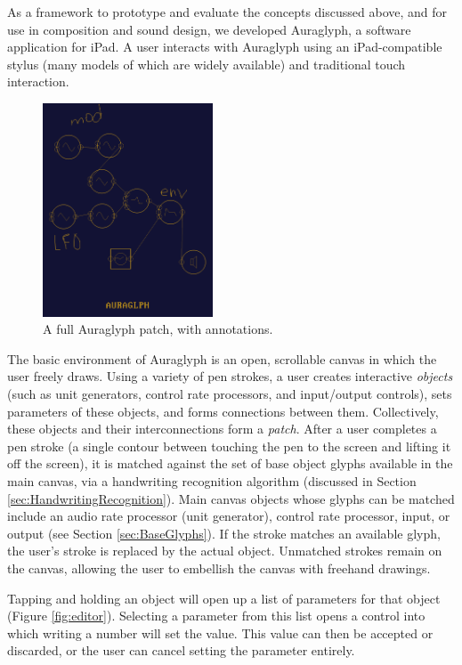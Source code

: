 \documentclass{nime-alternate}
\begin{document}
As a framework to prototype and evaluate the concepts discussed above, and for use in composition and sound design, we developed Auraglyph, a software application for iPad. 
A user interacts with Auraglyph using an iPad-compatible stylus (many models of which are widely available) and traditional touch interaction. 

\begin{figure}[h]
	\centering
		\includegraphics[width=0.45\textwidth]{figures/patch.png}
	\caption{A full Auraglyph patch, with annotations.}
	\label{fig:patch}
\end{figure}

The basic environment of Auraglyph is an open, scrollable canvas in which the user freely draws. 
Using a variety of pen strokes, a user creates interactive \emph{objects} (such as unit generators, control rate processors, and input/output controls), sets parameters of these objects, and forms connections between them. 
Collectively, these objects and their interconnections form a \emph{patch}. 
After a user completes a pen stroke (a single contour between touching the pen to the screen and lifting it off the screen), it is matched against the set of base object glyphs available in the main canvas, via a handwriting recognition algorithm (discussed in Section \ref{sec:HandwritingRecognition}). 
Main canvas objects whose glyphs can be matched include an audio rate processor (unit generator), control rate processor, input, or output (see Section \ref{sec:BaseGlyphs}). 
If the stroke matches an available glyph, the user's stroke is replaced by the actual object. 
Unmatched strokes remain on the canvas, allowing the user to embellish the canvas with freehand drawings. 

Tapping and holding an object will open up a list of parameters for that object (Figure \ref{fig:editor}). 
Selecting a parameter from this list opens a control into which writing a number will set the value. 
This value can then be accepted or discarded, or the user can cancel setting the parameter entirely. 
\end{document}

